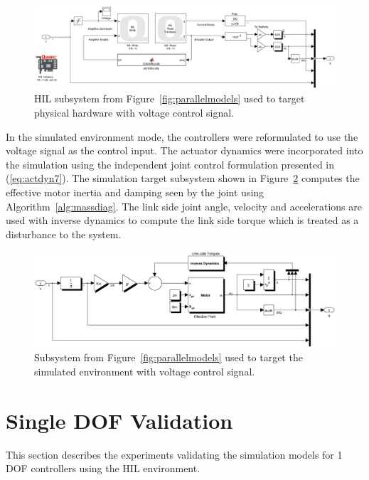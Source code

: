 \begin{figure}[!h]
	\centering
    \includegraphics[scale=0.45]{fig/experiments/hilmodel.eps} 
  	\caption{HIL subsystem from Figure~\ref{fig:parallelmodels} used to target physical hardware with voltage control signal.}
	\label{fig:hilmodel}
\end{figure}

In the simulated environment mode, the controllers were reformulated to use the voltage signal as the control input. The actuator dynamics were incorporated into the simulation using the independent joint control formulation presented in (\ref{eq:actdyn7}). The simulation target subsystem shown in Figure~\ref{fig:simmodel} computes the effective motor inertia and damping seen by the joint using Algorithm~\ref{alg:massdiag}. The link side joint angle, velocity and accelerations are used with inverse dynamics to compute the link side torque which is treated as a disturbance to the system. 

\begin{figure}[!h]
	\centering
    \includegraphics[scale=0.55]{fig/experiments/simmodel.eps} 
  	\caption{Subsystem from Figure~\ref{fig:parallelmodels} used to target the simulated environment with voltage control signal.}
	\label{fig:simmodel}
\end{figure}




\section{Single DOF Validation} %
\label{sec:1dof_validation}
This section describes the experiments validating the simulation models for 1 DOF controllers using the HIL environment. 

